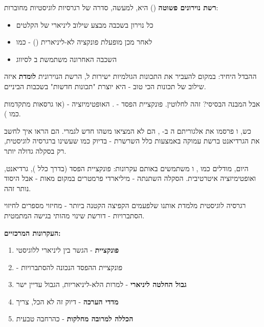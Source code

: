 \textbf{רשת נוירונים פשוטה} () היא, למעשה, סדרה של רגרסיות לוגיסטיות מחוברות:

\begin{itemize}
\item כל נוירון בשכבה מבצע שילוב ליניארי של הקלטים
\item לאחר מכן מופעלת פונקציה לא-ליניארית () - כמו 
\item השכבה האחרונה משתמשת ב לסיווג
\end{itemize}

ההבדל היחיד: במקום להעביר את התכונות הגולמיות ישירות ל, הרשת הנוירונית \textbf{לומדת} איזה שילוב של תכונות הכי טוב - היא יוצרת "תכונות חדשות" בשכבות הביניים.

אבל המבנה הבסיסי? זהה לחלוטין. פונקציית הפסד - . האופטימיזציה -  (או גרסאות מתקדמות כמו ).

כש, ו פרסמו את אלגוריתם ה ב- \cite{rumelhart1986}, הם לא המציאו משהו חדש לגמרי. הם הראו איך לחשב את הגרדיאנט ברשת עמוקה באמצעות כלל השרשרת - בדיוק כמו שעשינו ברגרסיה לוגיסטית, רק בסקלה גדולה יותר.

היום, מודלים כמו , ו משתמשים באותם עקרונות: פונקציית הפסד (בדרך כלל ), גרדיאנט, ואופטימיזציה איטרטיבית. הסקלה השתנתה - מיליארדי פרמטרים במקום מאות - אבל היסוד נותר זהה.


רגרסיה לוגיסטית מלמדת אותנו שלפעמים הקפיצה הקטנה ביותר - מחיזוי מספרים לחיזוי הסתברויות - דורשת שינוי מהותי בגישה המתמטית.

\textbf{העקרונות המרכזיים:}

\begin{enumerate}
\item \textbf{פונקציית } - הגשר בין ליניארי ללוגיסטי
\item \textbf{} - פונקציית ההפסד הנכונה להסתברויות
\item \textbf{גבול החלטה ליניארי} - למרות הלא-ליניאריות, הגבול עדיין ישר
\item \textbf{מדדי הערכה} - דיוק זה לא הכל, צריך 
\item \textbf{הכללה למרובה מחלקות} -  כהרחבה טבעית
\end{enumerate}

